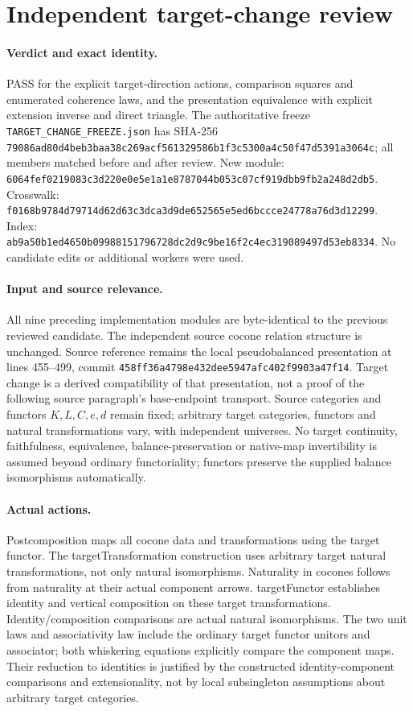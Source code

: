 \documentclass{article}
\begin{document}
\section*{Independent target-change review}
\paragraph{Verdict and exact identity.} PASS for the explicit target-direction actions, comparison squares and enumerated coherence laws, and the presentation equivalence with explicit extension inverse and direct triangle. The authoritative freeze \texttt{TARGET\_CHANGE\_FREEZE.json} has SHA-256 \texttt{79086ad80d4beb3baa38c269acf561329586b1f3c5300a4c50f47d5391a3064c}; all members matched before and after review. New module: \texttt{6064fef0219083c3d220e0e5e1a1e8787044b053c07cf919dbb9fb2a248d2db5}. Crosswalk: \texttt{f0168b9784d79714d62d63c3dca3d9de652565e5ed6bccce24778a76d3d12299}. Index: \texttt{ab9a50b1ed4650b09988151796728dc2d9c9be16f2c4ec319089497d53eb8334}. No candidate edits or additional workers were used.
\paragraph{Input and source relevance.} All nine preceding implementation modules are byte-identical to the previous reviewed candidate. The independent source cocone relation structure is unchanged. Source reference remains the local pseudobalanced presentation at lines 455--499, commit \texttt{458ff36a4798e432dee5947afc402f9903a47f14}. Target change is a derived compatibility of that presentation, not a proof of the following source paragraph's base-endpoint transport. Source categories and functors $K,L,C,e,d$ remain fixed; arbitrary target categories, functors and natural transformations vary, with independent universes. No target continuity, faithfulness, equivalence, balance-preservation or native-map invertibility is assumed beyond ordinary functoriality; functors preserve the supplied balance isomorphisms automatically.
\paragraph{Actual actions.} Postcomposition maps all cocone data and transformations using the target functor. The targetTransformation construction uses arbitrary target natural transformations, not only natural isomorphisms. Naturality in cocones follows from naturality at their actual component arrows. targetFunctor establishes identity and vertical composition on these target transformations. Identity/composition comparisons are actual natural isomorphisms. The two unit laws and associativity law include the ordinary target functor unitors and associator; both whiskering equations explicitly compare the component maps. Their reduction to identities is justified by the constructed identity-component comparisons and extensionality, not by local subsingleton assumptions about arbitrary target categories.
\end{document}
